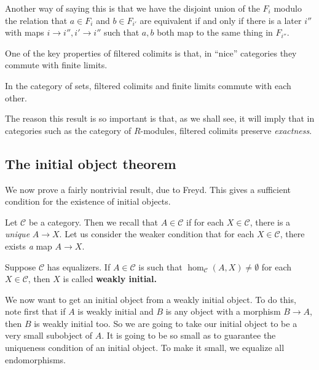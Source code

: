 Another way of saying this is that we have the disjoint union of the $F_i$
modulo the relation that $a \in F_i$ and $b \in F_{i'}$ are equivalent if and
only if there is a later $i''$ with maps $i \to i'', i' \to i''$ such that
$a,b$ both map to the same thing in $F_{i''}$.


One of the key properties of filtered colimits is that, in ``nice'' categories they commute with
finite limits.

\begin{proposition} 
In the category of sets, filtered colimits and finite limits commute with each
other.
\end{proposition} 

The reason this result is so important is that, as we shall see, it will imply
that in categories such as the category of $R$-modules, filtered colimits
preserve \emph{exactness}. 


\subsection{The initial object theorem}

We now prove a fairly nontrivial result, due to Freyd. This gives a sufficient
condition for the existence of initial objects.

Let $\mathcal{C}$ be a category. Then we recall that $A \in \mathcal{C}$ if
for each $X \in \mathcal{C}$, there is a \emph{unique} $A \to X$.
Let us consider the weaker condition that for each $ X \in \mathcal{C}$, there
exists \emph{a} map $A \to X$.

\begin{definition} Suppose $\mathcal{C}$ has equalizers.
If $A \in \mathcal{C}$ is such that $\hom_{\mathcal{C}}(A, X) \neq \emptyset$
for each $X \in \mathcal{C}$, then $X$ is called \textbf{weakly initial.}
\end{definition}

We now want to get an initial object from a weakly initial object.
To do this, note first that if $A$ is weakly initial and $B$ is any object
with a morphism $B \to A$, then $B$ is weakly initial too. So we are going to
take
our initial object to be a very small subobject of $A$.
It is going to be so small as to guarantee the uniqueness condition of an
initial object. To make it small, we equalize all endomorphisms.

